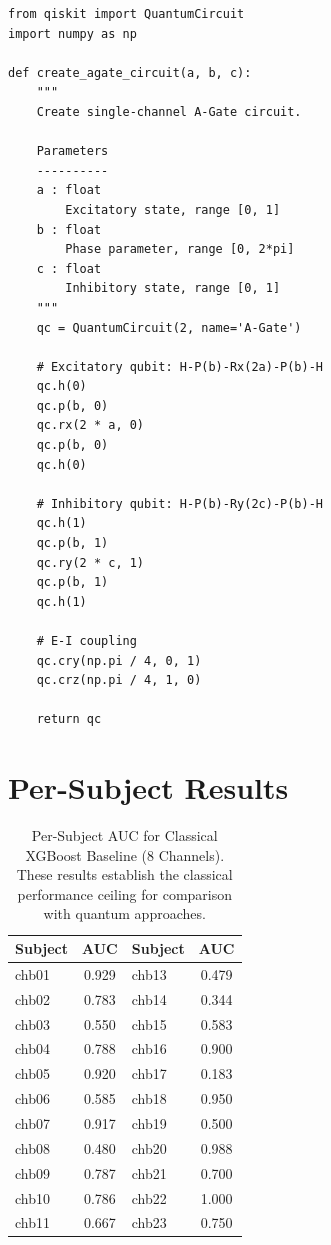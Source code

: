 \documentclass[11pt,a4paper]{article}
\begin{document}
\begin{lstlisting}
from qiskit import QuantumCircuit
import numpy as np

def create_agate_circuit(a, b, c):
    """
    Create single-channel A-Gate circuit.

    Parameters
    ----------
    a : float
        Excitatory state, range [0, 1]
    b : float
        Phase parameter, range [0, 2*pi]
    c : float
        Inhibitory state, range [0, 1]
    """
    qc = QuantumCircuit(2, name='A-Gate')

    # Excitatory qubit: H-P(b)-Rx(2a)-P(b)-H
    qc.h(0)
    qc.p(b, 0)
    qc.rx(2 * a, 0)
    qc.p(b, 0)
    qc.h(0)

    # Inhibitory qubit: H-P(b)-Ry(2c)-P(b)-H
    qc.h(1)
    qc.p(b, 1)
    qc.ry(2 * c, 1)
    qc.p(b, 1)
    qc.h(1)

    # E-I coupling
    qc.cry(np.pi / 4, 0, 1)
    qc.crz(np.pi / 4, 1, 0)

    return qc
\end{lstlisting}

\section{Per-Subject Results}

\begin{table}[htbp]
\centering
\caption{Per-Subject AUC for Classical XGBoost Baseline (8 Channels). These results establish the classical performance ceiling for comparison with quantum approaches.}
\label{tab:subjects}
\small
\begin{tabular}{lclc}
\toprule
Subject & AUC & Subject & AUC \\
\midrule
chb01 & 0.929 & chb13 & 0.479 \\
chb02 & 0.783 & chb14 & 0.344 \\
chb03 & 0.550 & chb15 & 0.583 \\
chb04 & 0.788 & chb16 & 0.900 \\
chb05 & 0.920 & chb17 & 0.183 \\
chb06 & 0.585 & chb18 & 0.950 \\
chb07 & 0.917 & chb19 & 0.500 \\
chb08 & 0.480 & chb20 & 0.988 \\
chb09 & 0.787 & chb21 & 0.700 \\
chb10 & 0.786 & chb22 & 1.000 \\
chb11 & 0.667 & chb23 & 0.750 \\
\bottomrule
\end{tabular}
\end{table}
\end{document}
